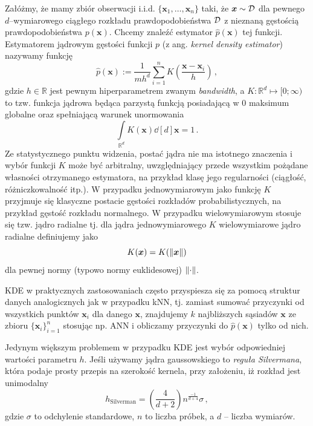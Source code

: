 \documentclass{myclass}
\numberwithin{equation}{subsection}
\begin{document}
Załóżmy, że mamy zbiór obserwacji i.i.d. \(\{\bm{x}_1, \ldots, \bm{x}_n\}\) taki, że \(\bm{x} \sim
\mathcal{D}\) dla pewnego \(d\)--wymiarowego ciągłego rozkładu prawdopodobieństwa \(\mathcal{D}\) z nieznaną
gęstością prawdopodobieństwa \(p(\bm{x})\). Chcemy znaleźć estymator \(\hat{p}(\bm{x})\) tej
funkcji. Estymatorem jądrowym gęstości funkcji \(p\) (z ang. \textit{kernel density estimator})
nazywamy funkcję
\begin{equation}\boxed{
    \hat{p}(\bm{x}) := \frac{1}{mh^d}\sum_{i=1}^n K\left(\frac{\bm{x} - \bm{x}_i}{h}\right)\,,
}\end{equation}
gdzie \(h \in \mathbb{R}\) jest pewnym hiperparametrem zwanym \textit{bandwidth}, a \(K:
\mathbb{R}^d \mapsto [0; \infty)\) to tzw. funkcja jądrowa będąca parzystą funkcją posiadającą w 0
maksimum globalne oraz spełniającą warunek unormowania
\begin{equation}
    \int\limits_{\mathbb{R}^d} K(\bm{x}) \dd[d]{\bm{x}}= 1\,.
\end{equation}
Ze statystycznego punktu widzenia, postać jądra nie ma istotnego znaczenia i wybór funkcji  \(K\)
może być arbitralny, uwzględniający przede wszystkim pożądane własności otrzymanego estymatora, na
przykład klasę jego regularności (ciągłość, różniczkowalność itp.). W przypadku jednowymiarowym jako
funkcję \(K\) przyjmuje się klasyczne postacie gęstości rozkładów probabilistycznych, na przykład
gęstość rozkładu normalnego. W przypadku wielowymiarowym stosuje się tzw. jądro radialne tj. dla
jądra jednowymiarowego \(K\) wielowymiarowe jądro radialne definiujemy jako
\begin{equation}
    K(\bm{x}) = K(\norm{\bm{x}})
\end{equation}
dla pewnej normy (typowo normy euklidesowej) \(\norm{\cdot}\).

KDE w praktycznych zastosowaniach często przyspiesza się za pomocą struktur danych analogicznych jak
w przypadku kNN, tj. zamiast sumować przyczynki od wszystkich punktów \(\bm{x}_i\) dla danego
\(\bm{x}\), znajdujemy \(k\) najbliższych sąsiadów \(\bm{x}\) ze zbioru \(\{\bm{x}_i\}_{i=1}^n\)
stosując np. ANN i obliczamy przyczynki do \(\hat{p}(\bm{x})\) tylko od nich.

Jedynym większym problemem w przypadku KDE jest wybór odpowiedniej wartości parametru \(h\). Jeśli
używamy jądra gaussowskiego to \emph{reguła Silvermana}, która podaje prosty przepis na szerokość
kernela, przy założeniu, iż rozkład jest unimodalny
\begin{equation}
    h_\mathrm{Silverman} = \left(\frac{4}{d + 2}\right)n^{\frac{-1}{d + 4}}\sigma\,,
\end{equation}
gdzie \(\sigma\) to odchylenie standardowe, \(n\) to liczba próbek, a \(d\) -- liczba wymiarów.
\end{document}
